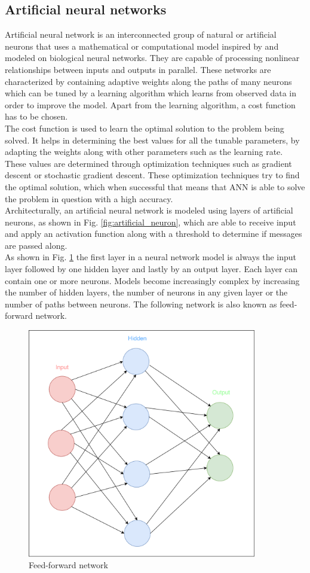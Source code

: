 \subsection{Artificial neural networks}
Artificial neural network is an interconnected group of natural or artificial neurons that uses a mathematical or computational model inspired by and modeled on biological neural networks. They are capable of processing nonlinear relationships between inputs and outputs in parallel. These networks are characterized by containing adaptive weights along the paths of many neurons which can be tuned by a learning algorithm which learns from observed data in order to improve the model. Apart from the learning algorithm, a cost function has to be chosen.\\
The cost function is used to learn the optimal solution to the problem being solved. It helps in determining the best values for all the tunable parameters, by adapting the weights along with other parameters such as the learning rate. These values are determined through optimization techniques such as gradient descent or stochastic gradient descent. These optimization techniques try to find the optimal solution, which when successful that means that ANN is able to solve the problem in question with a high accuracy. \\
Architecturally, an artificial neural network is modeled using layers  of artificial neurons, as shown in Fig. \ref{fig:artificial_neuron}, which are able to receive input and apply an activation function along with a threshold to determine if messages are passed along.\\
As shown in Fig. \ref{fig:simple_neural_network} the first layer in a neural network model is always the input layer followed by one hidden layer and lastly by an output layer. Each layer can contain one or more neurons. Models become increasingly complex by increasing the number of hidden layers, the number of neurons in any given layer or the number of paths between neurons. The following network is also known as feed-forward network. \\
\begin{figure}[h!]
\includegraphics[width=10cm,center,keepaspectratio]{figures/simple_neural_network}
\caption{Feed-forward network}
\label{fig:simple_neural_network}
\end{figure}
